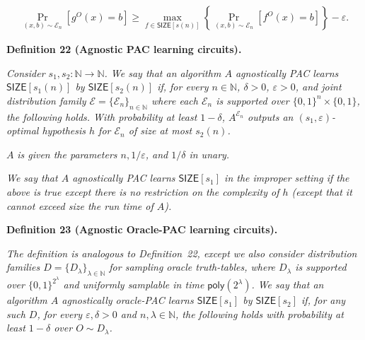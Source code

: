 \documentclass[10pt,a4paper]{article}
\begin{document}
\[\begin{gathered}
\Pr_{(x,b)\sim\mathcal{E}_{n}}[g^{O}(x)=b]\geq\max_{f\in{\mathsf{SIZE}}[s(n)]}\left\{\Pr_{(x,b)\sim\mathcal{E}_{n}}[f^{O}(x)=b]\right\}-\varepsilon.
\end{gathered}\]







\par\medskip\noindent\textbf{
\textbf{Definition 22}\textbf{ }(Agnostic PAC learning circuits)\textbf{.}
}\par



\emph{Consider $s_{1},s_{2}:\mathbb{N}\to\mathbb{N}$. We say that an algorithm $A$ agnostically PAC learns ${\mathsf{SIZE}}[s_{1}(n)]$ by ${\mathsf{SIZE}}[s_{2}(n)]$ if, for every $n\in\mathbb{N}$, $\delta>0$, $\varepsilon>0$, and joint distribution family $\mathcal{E}=\{\mathcal{E}_{n}\}_{n\in\mathbb{N}}$ where each $\mathcal{E}_{n}$ is supported over $\{0,1\}^{n}\times\{0,1\}$, the following holds. With probability at least $1-\delta$, $A^{\mathcal{E}_{n}}$ outputs an $(s_{1},\varepsilon)$-optimal hypothesis $h$ for $\mathcal{E}_{n}$ of size at most $s_{2}(n)$.}\par




$A$\emph{ is given the parameters $n,1/\varepsilon$, and $1/\delta$ in unary.}\par




\emph{We say that $A$ agnostically PAC learns ${\mathsf{SIZE}}[s_{1}]$ in the improper setting if the above is true except there is no restriction on the complexity of $h$ (except that it cannot exceed size the run time of $A$).}\par







\par\medskip\noindent\textbf{
\textbf{Definition 23}\textbf{ }(Agnostic Oracle-PAC learning circuits)\textbf{.}
}\par



\emph{The definition is analogous to Definition 22, except we also consider distribution families $D=\{D_{\lambda}\}_{\lambda\in\mathbb{N}}$ for sampling oracle truth-tables, where $D_{\lambda}$ is supported over $\{0,1\}^{2^{\lambda}}$ and uniformly samplable in time ${\mathsf{poly}}(2^{\lambda})$. We say that an algorithm $A$ agnostically oracle-PAC learns ${\mathsf{SIZE}}[s_{1}]$ by ${\mathsf{SIZE}}[s_{2}]$ if, for any such $D$, for every $\varepsilon,\delta>0$ and $n,\lambda\in\mathbb{N}$, the following holds with probability at least $1-\delta$ over $O\sim D_{\lambda}$.}\par
\end{document}
